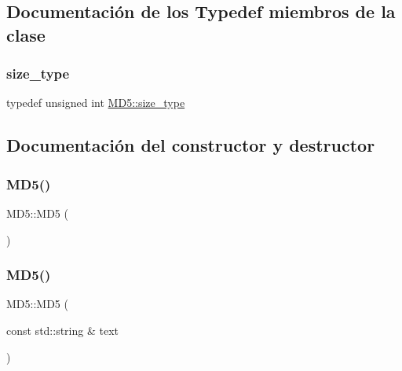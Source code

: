 \subsection{Documentación de los \textquotesingle{}Typedef\textquotesingle{} miembros de la clase}
\mbox{\label{classMD5_aa836972700679dbcff6ae8337f6db464}} 
\subsubsection{\texorpdfstring{size\+\_\+type}{size\_type}}
{\footnotesize\ttfamily typedef unsigned int \hyperlink{classMD5_aa836972700679dbcff6ae8337f6db464}{M\+D5\+::size\+\_\+type}}



\subsection{Documentación del constructor y destructor}
\mbox{\label{classMD5_afa6155ec36de415ab2dcf5e54b670d13}} 
\subsubsection{\texorpdfstring{M\+D5()}{MD5()}\hspace{0.1cm}{\footnotesize\ttfamily [1/2]}}
{\footnotesize\ttfamily M\+D5\+::\+M\+D5 (\begin{DoxyParamCaption}{ }\end{DoxyParamCaption})}

\mbox{\label{classMD5_a155356ffd713345e69e6dcbd9f8da6ce}} 
\subsubsection{\texorpdfstring{M\+D5()}{MD5()}\hspace{0.1cm}{\footnotesize\ttfamily [2/2]}}
{\footnotesize\ttfamily M\+D5\+::\+M\+D5 (\begin{DoxyParamCaption}\item[{const std\+::string \&}]{text }\end{DoxyParamCaption})}



